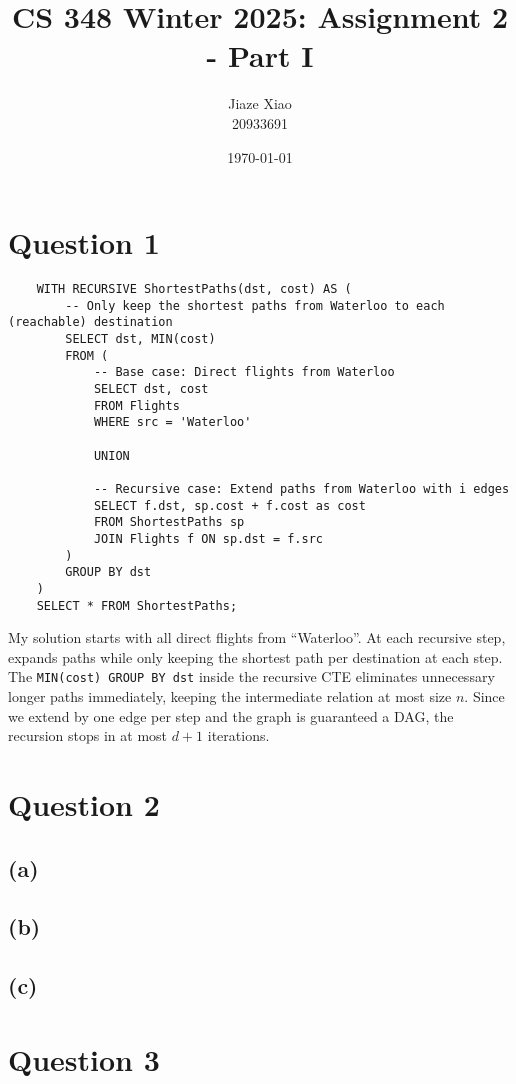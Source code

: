 \documentclass{article}
\title{\textbf{CS 348 Winter 2025: Assignment 2 - Part I}}
\author{Jiaze Xiao \\ 20933691}
\date{\today}
\begin{document}
\maketitle

\section*{Question 1}
\begin{lstlisting}
    WITH RECURSIVE ShortestPaths(dst, cost) AS (
        -- Only keep the shortest paths from Waterloo to each (reachable) destination
        SELECT dst, MIN(cost)
        FROM (
            -- Base case: Direct flights from Waterloo
            SELECT dst, cost
            FROM Flights
            WHERE src = 'Waterloo'

            UNION

            -- Recursive case: Extend paths from Waterloo with i edges
            SELECT f.dst, sp.cost + f.cost as cost
            FROM ShortestPaths sp
            JOIN Flights f ON sp.dst = f.src
        )
        GROUP BY dst
    )
    SELECT * FROM ShortestPaths;
\end{lstlisting}
My solution starts with all direct flights from ``Waterloo''. At each recursive step, expands paths while only keeping the shortest path per destination at each step. The \texttt{MIN(cost) GROUP BY dst} inside the recursive CTE eliminates unnecessary longer paths immediately, keeping the intermediate relation at most size $n$. Since we extend by one edge per step and the graph is guaranteed a DAG, the recursion stops in at most $d+1$ iterations.

\newpage
\section*{Question 2}
\subsection*{(a)}

\newpage
\subsection*{(b)}

\newpage
\subsection*{(c)}

\newpage
\section*{Question 3}
\end{document}
